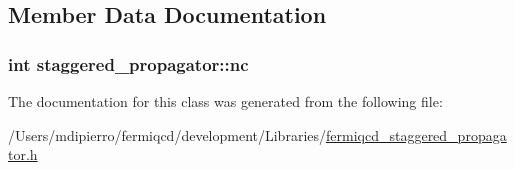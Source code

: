 \subsection{Member Data Documentation}
\hypertarget{classstaggered__propagator_a1f2816b7b6b4f9b6779224fcdd0d6aff}{
\subsubsection[{nc}]{\setlength{\rightskip}{0pt plus 5cm}int {\bf staggered\_\-propagator::nc}}}
\label{classstaggered__propagator_a1f2816b7b6b4f9b6779224fcdd0d6aff}


The documentation for this class was generated from the following file:\begin{DoxyCompactItemize}
\item 
/Users/mdipierro/fermiqcd/development/Libraries/\hyperlink{fermiqcd__staggered__propagator_8h}{fermiqcd\_\-staggered\_\-propagator.h}\end{DoxyCompactItemize}
